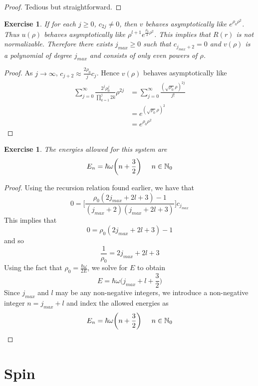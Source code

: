 \documentclass[12pt]{amsart}
\newtheorem{ex}[thm]{Exercise}
\newcommand{\om}{\omega}
\newcommand{\N}{\mathbb{N}}
\begin{document}
\begin{proof}
Tedious but straightforward.
\end{proof}

\begin{ex}
If for each $j \geq 0$, $c_{2j} \neq 0$, then $v$ behaves asymptotically like $e^{\rho_0\rho^2}$. Thus $u(\rho)$ behaves asymptotically like $\rho^{l+1}e^{\frac{\rho_0}{2}\rho^2}$. This implies that $R(r)$ is not normalizable. Therefore there exists $j_{max} \geq 0$ such that $c_{j_{max}+2} = 0$ and $v(\rho)$ is a polynomial of degree $j_{max}$ and consists of only even powers of $\rho$. 
\end{ex}

\begin{proof}
As $j \rightarrow \infty$, $c_{j+2} \approx \frac{2 \rho_0}{j}c_j$. Hence $v(\rho)$ behaves asymptotically like 
\begin{align*}
\sum_{j=0}^{\infty}\frac{2^j\rho_0^j}{\prod_{k=1}^j2k}\rho^{2j}
&= \sum_{j=0}^{\infty}\frac{(\sqrt{\rho_0} \rho)^{2j}}{j!}\\
&= e^{(\sqrt{\rho_0}\rho)^2}\\
&= e^{\rho_0 \rho^2}
\end{align*}
\end{proof}

\begin{ex}
The energies allowed for this system are $$E_n = \hbar \om \bigg(n+\frac{3}{2} \bigg) \hspace{.5cm}n \in \N_0$$
\end{ex}

\begin{proof}
Using the recursion relation found earlier, we have that $$0 = \bigg[ \frac{\rho_0(2j_{max}+2l+3)-1}{(j_{max}+2)(j_{max}+2l+3)}\bigg]c_{j_{max}} $$ This implies that $$0 = \rho_0(2j_{max}+2l+3)-1$$ and so $$\frac{1}{\rho_0} = 2j_{max} + 2l +3$$ Using the fact that $\rho_0 = \frac{\hbar \om}{2E}$, we solve for $E$ to obtain $$E = \hbar \om \bigg( j_{max} + l + \frac{3}{2}\bigg)$$ Since $j_{max}$ and $l$ may be any non-negative integers, we introduce a non-negative integer $n = j_{max}+l$ and index the allowed energies as $$E_n = \hbar \om\bigg(n+ \frac{3}{2} \bigg) \hspace{.5cm} n \in \N_0$$
\end{proof}
\newpage

\section{Spin}
\end{document}

